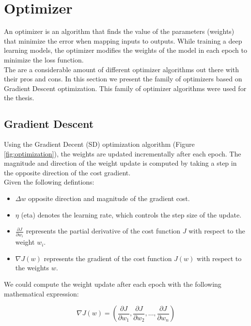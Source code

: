 \newpage

\section{Optimizer}

An optimizer is an algorithm that finds the value of the parameters (weights)
that minimize the error when mapping inputs to outputs. While training a deep
learning models, the optimizer modifies the weights of the model in each epoch
to minimize the loss function. \\

The are a considerable amount of different optimizer algorithms out there with
their pros and cons. In this section we present the family of optimizers based
on Gradient Descent optimization. This family of optimizer algorithms were used
for the thesis. \\

\subsection{Gradient Descent}

Using the Gradient Decent (SD) optimization algorithm (Figure
\ref{fig:optimization}), the weights are updated incrementally after each
epoch. The magnitude and direction of the weight update is computed by taking a
step in the opposite direction of the cost gradient. \\

Given the following defintions:

\begin{itemize}
  \item \(\Delta w\) opposite direction and magnitude of the gradient cost.
  \item \(\eta\) (eta) denotes the learning rate, which controls the step size of the update.
  \item  \(\frac{\partial J}{\partial w_i}\) represents the partial derivative of the cost function \(J\) with respect to the weight \(w_i\).
  \item \(\nabla J(w)\) represents the gradient of the cost function \(J(w)\) with respect to the weights \(w\).
\end{itemize}

We could compute the weight update after each epoch with the following
mathematical expression:

\[\nabla J(w) = (\frac{\partial J}{\partial w_1}, \frac{\partial J}{\partial w_2}, \ldots, \frac{\partial J}{\partial w_n})\]

